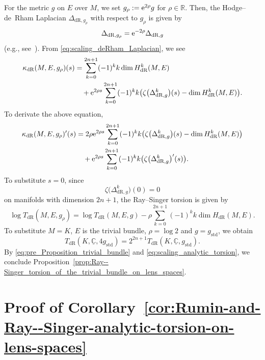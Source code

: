 \documentclass[pdftex]{sigma}
\numberwithin{equation}{section}
\newcommand{\deRham}{\mathrm{dR}}
\begin{document}
For the metric $g$ on $E$ over $M$,
we set $g_{\rho} := {\rm e}^{2 \rho} g$ for $\rho \in \mathbb{R}$.
Then, the Hodge--de~Rham Laplacian $\Delta_{\deRham , g_{\rho}}$ with respect to $g_{\rho}$
is given by
\begin{equation}
 \Delta_{\deRham , g_{\rho}} = {\rm e}^{ -2 \rho } \Delta_{\deRham , g}
 \label{eq:scaling_deRham_Laplacian}
\end{equation}
(e.g., see~\cite[equation~(5.4)]{Rosenberg-97}).
From \eqref{eq:scaling_deRham_Laplacian}, we see
\begin{align*}
 \kappa_{\deRham} (M, E , g_{\rho} ) (s)
 &{}=
 \sum_{k=0}^{2n+1} (-1)^k k \dim H_{\deRham}^k (M, E)
 \\
 &\quad{}+ {\rm e}^{2 \rho s }
 \sum_{k=0}^{2n+1} (-1)^k k \big(
 \zeta \big(\Delta_{\deRham , g}^k \big) (s )
 -
 \dim H_{\deRham}^k (M, E)
 \big)
 .
\end{align*}
To derivate the above equation,
\begin{align*}
 \kappa_{\deRham} (M, E , g_{\rho} ) ' (s)
 & =
 2 \rho {\rm e}^{2 \rho s }
 \sum_{k=0}^{2n+1} (-1)^k k \big(
 \zeta \big(\Delta_{\deRham , g}^k \big) (s )
 -
 \dim H_{\deRham}^k (M, E)
 \big)
 \\
 & \quad
 + {\rm e}^{2 \rho s }
 \sum_{k=0}^{2n+1} (-1)^k k \big(
 \zeta \big(\Delta_{\deRham , g}^k \big) ' (s )
 \big)
 .
\end{align*}
To substitute $s = 0$,
since
\[
\zeta \big(\Delta_{\deRham , g}^k \big) (0 ) = 0
\]
on manifolds with dimension $2n+1$,
the Ray--Singer torsion is given by
\begin{equation}
 \log T_{\deRham} (M, E , g_{\rho})
 =
 \log T_{\deRham} (M, E , g)
 - \rho \sum_{k = 0 }^{2n+1} (-1)^k k \dim H_{\deRham} (M, E)
 .
 \label{eq:scaling_analytic_torsion_2}
\end{equation}
To substitute $M = K$, $E$ is the trivial bundle, $\rho = \log 2 $ and $g = g_{\mathrm{std}}$,
we obtain
\begin{equation}
 T_{\deRham} (K, \underline{\mathbb{C}} , 4 g_{\mathrm{std}})
 = 2^{2n+1} T_{\deRham} (K, \underline{\mathbb{C}} , g_{\mathrm{std}}) .
 \label{eq:scaling_analytic_torsion}
\end{equation}
By \eqref{eq:pre_Proposition_trivial_bundle} and \eqref{eq:scaling_analytic_torsion},
we conclude Proposition~\ref{prop:Ray--Singer_torsion_of_the_trivial_bundle_on_lens_spaces}.

\section{Proof of Corollary~\ref{cor:Rumin-and-Ray--Singer-analytic-torsion-on-lens-spaces}}
\label{sec:Ray--Singer_torsion_and_contact_analytic_torsion}
\end{document}
